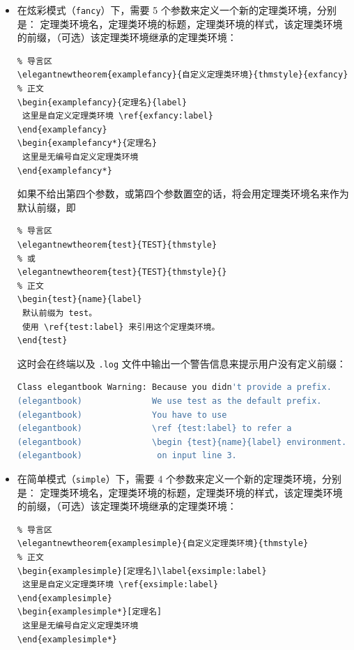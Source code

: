 \documentclass[lang=cn,newtx,10pt,scheme=chinese,pad,twocol]{zznote}
\begin{document}
\begin{itemize}
	\item 在炫彩模式（\lstinline{fancy}）下，需要 5 个参数来定义一个新的定理类环境，分别是：
	      定理类环境名，定理类环境的标题，定理类环境的样式，该定理类环境的前缀，（可选）该定理类环境继承的定理类环境：

	      \begin{lstlisting}
% 导言区
\elegantnewtheorem{examplefancy}{自定义定理类环境}{thmstyle}{exfancy}
% 正文
\begin{examplefancy}{定理名}{label}
 这里是自定义定理类环境 \ref{exfancy:label}
\end{examplefancy}
\begin{examplefancy*}{定理名}
 这里是无编号自定义定理类环境
\end{examplefancy*}
\end{lstlisting}

	      如果不给出第四个参数，或第四个参数置空的话，将会用定理类环境名来作为默认前缀，即
	      \begin{lstlisting}
% 导言区
\elegantnewtheorem{test}{TEST}{thmstyle}
% 或
\elegantnewtheorem{test}{TEST}{thmstyle}{}
% 正文
\begin{test}{name}{label}
 默认前缀为 test。
 使用 \ref{test:label} 来引用这个定理类环境。
\end{test}
\end{lstlisting}

	      这时会在终端以及 \verb|.log| 文件中输出一个警告信息来提示用户没有定义前缀：

	      \begin{lstlisting}[language=bash]
Class elegantbook Warning: Because you didn't provide a prefix. 
(elegantbook)              We use test as the default prefix. 
(elegantbook)              You have to use 
(elegantbook)              \ref {test:label} to refer a 
(elegantbook)              \begin {test}{name}{label} environment. 
(elegantbook)               on input line 3.
\end{lstlisting}

	\item 在简单模式（\lstinline{simple}）下，需要 4 个参数来定义一个新的定理类环境，分别是：
	      定理类环境名，定理类环境的标题，定理类环境的样式，该定理类环境的前缀，（可选）该定理类环境继承的定理类环境：
	      \begin{lstlisting}
% 导言区
\elegantnewtheorem{examplesimple}{自定义定理类环境}{thmstyle}
% 正文
\begin{examplesimple}[定理名]\label{exsimple:label}
 这里是自定义定理类环境 \ref{exsimple:label}
\end{examplesimple}
\begin{examplesimple*}[定理名]
 这里是无编号自定义定理类环境
\end{examplesimple*}
\end{lstlisting}


\end{itemize}
\end{document}
